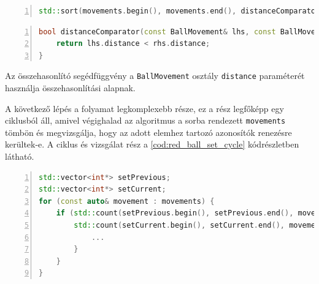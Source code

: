 \vspace{5mm}
\hspace{-10mm}
\begin{minipage}{\linewidth}
\begin{lstlisting}[language=C++, numbers=left, caption={Piros golyók közti távolságok sorba rendezése.}, label={cod:red_ball_sort}]
std::sort(movements.begin(), movements.end(), distanceComparator);
\end{lstlisting}
\end{minipage}

\vspace{5mm}
\hspace{-10mm}
\begin{minipage}{\linewidth}
\begin{lstlisting}[language=C++, numbers=left, caption={A \ref{cod:red_ball_sort} kódrészletben használt összehasonlító segédfüggvény.}, label={cod:red_ball_sort_helper}]
bool distanceComparator(const BallMovement& lhs, const BallMovement& rhs) {
    return lhs.distance < rhs.distance;
}
\end{lstlisting}
\end{minipage}

\par Az összehasonlító segédfüggvény a \lstinline{BallMovement} osztály \lstinline{distance} paraméterét használja összehasonlítási alapnak.
\par A következő lépés a folyamat legkomplexebb része, ez a rész legfőképp egy ciklusból áll, amivel végighalad az algoritmus a sorba rendezett \lstinline{movements} tömbön és megvizsgálja, hogy az adott elemhez tartozó azonosítók renezésre kerültek-e. A ciklus és vizsgálat rész a \ref{cod:red_ball_set_cycle} kódrészletben látható.

\vspace{5mm}
\hspace{-10mm}
\begin{minipage}{\linewidth}
\begin{lstlisting}[language=C++, numbers=left, caption={A \ref{cod:red_ball_sort} kódrészletben használt összehasonlító segédfüggvény.}, label={cod:red_ball_set_cycle}]
std::vector<int*> setPrevious;
std::vector<int*> setCurrent;
for (const auto& movement : movements) {
    if (std::count(setPrevious.begin(), setPrevious.end(), movement.previousId) <= 0 &&
        std::count(setCurrent.begin(), setCurrent.end(), movement.currentId) <= 0) {
            ...
        }
    }
}
\end{lstlisting}
\end{minipage}

